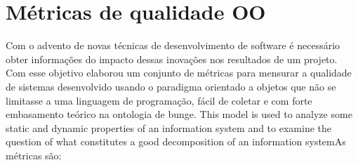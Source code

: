 


\section{Métricas de qualidade OO}

Com o advento de novas técnicas de desenvolvimento de software é necessário
obter informações do impacto dessas inovações nos resultados de um projeto. Com
esse objetivo  elaborou um conjunto de métricas para mensurar a
qualidade de sistemas desenvolvido usando o paradigma orientado a objetos que
não se limitasse a uma linguagem de programação, fácil de coletar e com forte
embasamento teórico na ontologia de bunge. This model is used to analyze
some static and dynamic properties of an information system and to examine the
question of what constitutes a good decomposition of an information
system\cite{WandWeber}As métricas são:





